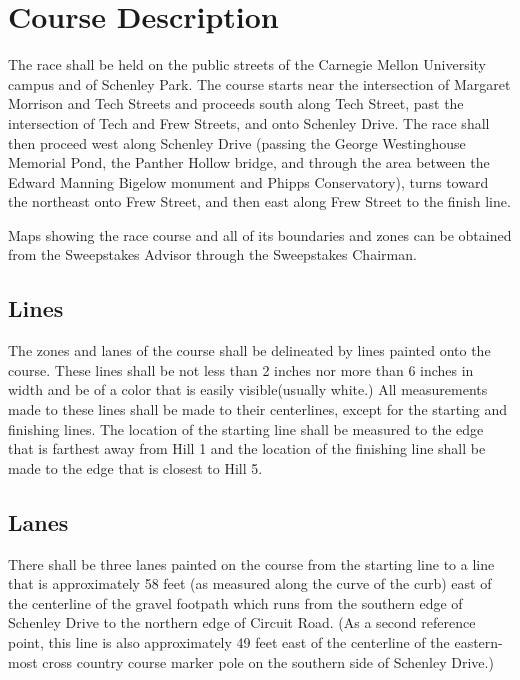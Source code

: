 \chapter{Course Description}

	The race shall be held on the public streets of the Carnegie Mellon University
	campus and of Schenley Park. The course starts near the intersection of
	Margaret Morrison and Tech Streets and proceeds south along Tech Street, past
	the intersection of Tech and Frew Streets, and onto Schenley Drive. The race
	shall then proceed west along Schenley Drive (passing the George Westinghouse
	Memorial Pond, the Panther Hollow bridge, and through the area between the
	Edward Manning Bigelow monument and Phipps Conservatory), turns toward the
	northeast onto Frew Street, and then east along Frew Street to the finish line.

	Maps showing the race course and all of its boundaries and zones can be
	obtained from the Sweepstakes Advisor through the Sweepstakes Chairman.

\section{Lines}

	The zones and lanes of the course shall be delineated by lines painted onto the
	course. These lines shall be not less than 2 inches nor more than 6 inches in
	width and be of a color that is easily visible(usually white.) All
	measurements made to these lines shall be made to their centerlines, except for
	the starting and finishing lines. The location of the starting line shall be
	measured to the edge that is farthest away from Hill 1 and the location of the
	finishing line shall be made to the edge that is closest to Hill 5.

\section{Lanes}

	There shall be three lanes painted on the course from the starting line to a
	line that is approximately 58 feet (as measured along the curve of the curb)
	east of the centerline of the gravel footpath which runs from the southern edge
	of Schenley Drive to the northern edge of Circuit Road. (As a second reference
	point, this line is also approximately 49 feet east of the centerline of the
	eastern-most cross country course marker pole on the southern side of Schenley
	Drive.)

